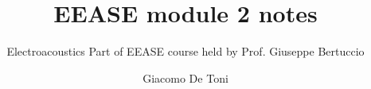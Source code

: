 \documentclass{GDTReportClass}
\title{EEASE module 2 notes}  %
\subtitle{Electroacoustics Part of EEASE course held by Prof. Giuseppe Bertuccio}  %
\author{Giacomo De Toni}  %
\begin{document}
    \settingfrontmatter  %

    \settingmaincontent  

    
    
    
    
    
    
    
    
    
    
    
    
    
    
\end{document}
